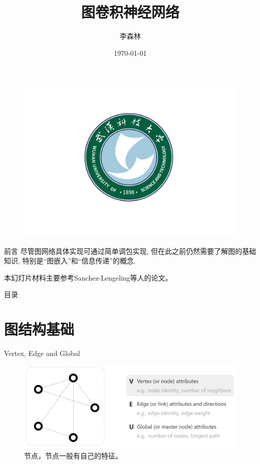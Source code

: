 \documentclass{beamer}
\author[Forest Lee]{李森林}
\title[Graph neural network]{图卷积神经网络}
\institute{武汉科技大学 \\ 理学院 \\ 重点实验室}
\date{\today}
\begin{document}

\songti %
\setsansfont{Times New Roman} %

\begin{frame}  %
    \titlepage
    \begin{figure}[htpb]
        \centering
        \vspace{-0.7cm}
        \includegraphics[width=0.45\linewidth]{wust.png}
    \end{figure}
\end{frame}

\begin{frame}{前言}
    尽管图网络具体实现可通过简单调包实现, 但在此之前仍然需要了解图的基础知识, 特别是``图嵌入''和``信息传递''的概念. \newline

    本幻灯片材料主要参考Sanchez-Lengeling\cite{sanchez-lengeling2021a}等人的论文。
\end{frame}

\begin{frame}{目录}\small
    \tableofcontents[subsectionstyle=hide]
\end{frame}

\AtBeginSubsection[]{
    \begin{frame}
        \tableofcontents[currentsubsection]
    \end{frame}
}

\section{图结构基础}


\begin{frame}{Vertex, Edge and Global}
    \begin{figure}
        \includegraphics[width=\textwidth]{vertex.png}
        \caption{节点，节点一般有自己的特征。}
    \end{figure}
\end{frame}
\end{document}
